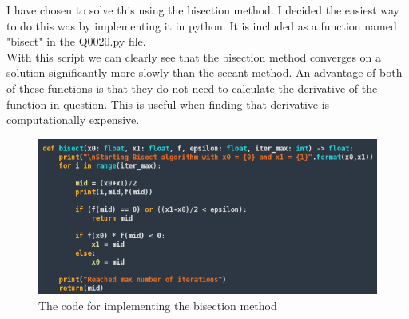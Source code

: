 I have chosen to solve this using the bisection method. I decided the easiest way to do this was by implementing it in python. It is included as a function named "bisect" in the Q0020.py file.\\
With this script we can clearly see that the bisection method converges on a solution significantly more slowly than the secant method. An advantage of both of these functions is that they do not need to calculate the derivative of the function in question. This is useful when finding that derivative is computationally expensive.
\begin{figure}[ht]
  \centering
  \includegraphics[width = \linewidth]{code.png}
  \caption{The code for implementing the bisection method}
\end{figure}
